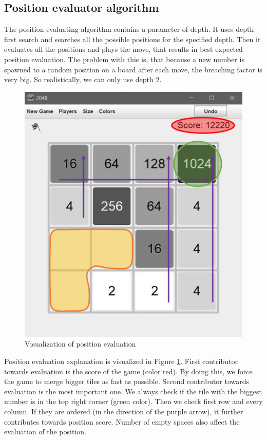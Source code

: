 \documentclass[sigconf,nonacm]{acmart}
\begin{document}
\subsection{Position evaluator algorithm}

The position evaluating algorithm contains a parameter of depth. It uses depth first search and searches all the possible positions for the specified depth. Then it evaluates all the positions and plays the move, that results in best expected position evaluation. The problem with this is, that because a new number is spawned to a random position on a board after each move, the breaching factor is very big. So realistically, we can only use depth 2.

\begin{figure}[!ht]
    \centering
    \begin{adjustbox}{scale=0.35}
    \includegraphics{static/evaluator.png}
    \end{adjustbox}
    \caption{Visualization of position evaluation}
    \label{fig:evaluator}
\end{figure}

Position evaluation explanation is visualized in Figure \ref{fig:evaluator}. First contributor towards evaluation is the score of the game (color red). By doing this, we force the game to merge bigger tiles as fast as possible. Second contributor towards evaluation is the most important one. We always check if the tile with the biggest number is in the top right corner (green color). Then we check first row and every column. If they are ordered (in the direction of the purple arrow), it further contributes towards position score. Number of empty spaces also affect the evaluation of the position.
\end{document}
